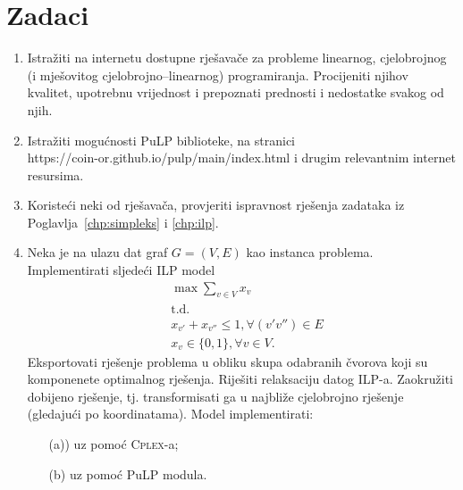 \documentclass[a4paper, utf8, 11pt, colorlinks]{book}
\theoremstyle{definition}
\begin{document}
\section{Zadaci}
\begin{enumerate}
	\item Istražiti na internetu dostupne  rješavače za probleme linearnog, cjelobrojnog (i mješovitog cjelobrojno--linearnog) programiranja. Procijeniti njihov kvalitet, upotrebnu vrijednost i prepoznati   prednosti i nedostatke svakog od njih.
	\item Istražiti mogućnosti PuLP biblioteke, na stranici\\ https://coin-or.github.io/pulp/main/index.html i drugim relevantnim internet resursima.
	
	\item Koristeći neki od rješavača, provjeriti ispravnost rješenja zadataka iz Poglavlja~\ref{chp:simpleks} i \ref{chp:ilp}.
	
	\item Neka je na ulazu dat graf  $G = (V, E)$ kao instanca problema. Implementirati sljedeći ILP model
	\begin{align*}
		& \max \sum_{v \in V} x_v \\
		& \mbox{t.d.} \\
		& x_{v'} + x_{v''} \leq 1, \forall (v' v'')\in E \\
		& x_v \in \{0, 1 \}, \forall v \in  V.
	\end{align*}
Eksportovati rješenje problema u obliku skupa odabranih čvorova koji su komponenete optimalnog rješenja. Riješiti relaksaciju datog ILP-a. Zaokružiti dobijeno rješenje, tj. transformisati ga u najbliže cjelobrojno rješenje (gledajući po koordinatama).  Model implementirati:
\begin{enumerate}
	\item[(a))]  uz pomoć \textsc{Cplex}-a; 
	\item[(b)] uz pomoć PuLP modula.
\end{enumerate}


\end{enumerate}
\end{document}
